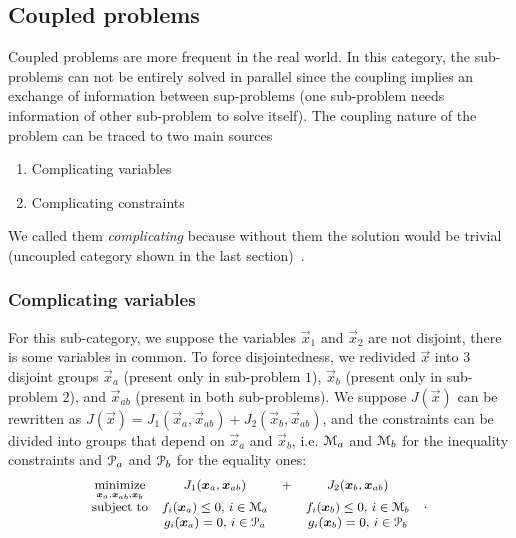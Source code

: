 \documentclass[../main.tex]{subfiles}
\begin{document}
\subsection{Coupled problems}
Coupled problems are more frequent in the real world.
In this category, the sub-problems can not be entirely solved in parallel since the coupling implies an exchange of information between sup-problems (one sub-problem needs information of other sub-problem to solve itself).
The coupling nature of the problem can be traced to two main sources
\begin{enumerate}
  \item Complicating variables
  \item Complicating constraints
\end{enumerate}
We called them \emph{complicating} because without them the solution would be trivial (uncoupled category shown in the last section)~\cite{ConejoEtAl2006}.

\subsubsection{Complicating variables}
For this sub-category, we suppose the variables $\vec{x}_{1}$ and $\vec{x}_{2}$ are not disjoint, there is some variables in common.
To force disjointedness, we redivided $\vec{x}$ into $3$ disjoint groups $\vec{x}_{a}$ (present only in sub-problem $1$), $\vec{x}_{b}$ (present only in sub-problem $2$), and $\vec{x}_{ab}$ (present in both sub-problems).
We suppose $J(\vec{x})$ can be rewritten  as ${J(\vec{x})=J_{1}(\vec{x}_{a},\vec{x}_{ab})+J_{2}(\vec{x}_{b},\vec{x}_{ab})}$, and the constraints can be divided into groups that depend on $\vec{x}_{a}$ and $\vec{x}_{b}$, i.e. $\mathcal{M}_{a}$ and $\mathcal{M}_{b}$ for the inequality constraints and $\mathcal{P}_{a}$ and $\mathcal{P}_{b}$ for the equality ones:
\begin{equation}\label{eq:general_complicating_variables_optimization_problem}
  \small
  \begin{aligned}
    \begin{matrix}
      \underset{\boldsymbol{x}_{a},\boldsymbol{x}_{ab},\boldsymbol{x}_{b}}{\mathrm{minimize}}  &J_{1}(\boldsymbol{x}_{a},\boldsymbol{x}_{ab})&+&J_{2}(\boldsymbol{x}_{b},\boldsymbol{x}_{ab})&\\
      \mathrm{subject~ to} &

      f_{i}(\boldsymbol{x}_{a}) \leq 0 \text{, } i\in\mathcal{M}_{a} & & f_{i}(\boldsymbol{x}_{b}) \leq 0 \text{, } i\in\mathcal{M}_{b}\\
      & g_{i}(\boldsymbol{x}_{a}) = 0\text{, } i\in\mathcal{P}_{a}& & g_{i}(\boldsymbol{x}_{b}) = 0\text{, } i\in\mathcal{P}_{b}\\
    \end{matrix}
  \end{aligned}.
\end{equation}
\end{document}
